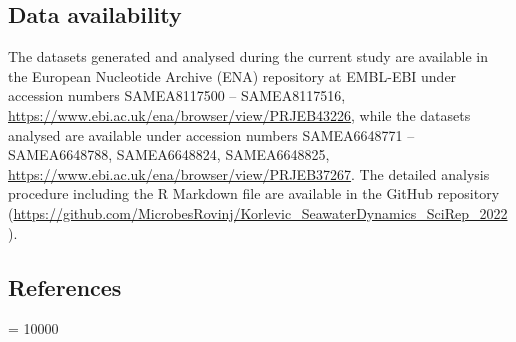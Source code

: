 \documentclass[
  12pt,
]{article}
\begin{document}
\hypertarget{data-availability}{%
\subsection{Data availability}\label{data-availability}}

The datasets generated and analysed during the current study are
available in the European Nucleotide Archive (ENA) repository at
EMBL-EBI under accession numbers SAMEA8117500 -- SAMEA8117516,
\url{https://www.ebi.ac.uk/ena/browser/view/PRJEB43226}, while the
datasets analysed are available under accession numbers SAMEA6648771 --
SAMEA6648788, SAMEA6648824, SAMEA6648825,
\url{https://www.ebi.ac.uk/ena/browser/view/PRJEB37267}. The detailed
analysis procedure including the R Markdown file are available in the
GitHub repository
(\url{https://github.com/MicrobesRovinj/Korlevic_SeawaterDynamics_SciRep_2022}).

\newpage

\hypertarget{references}{%
\subsection{References}\label{references}}

\interlinepenalty = 10000
\setlength{\emergencystretch}{3.5em}
\end{document}
